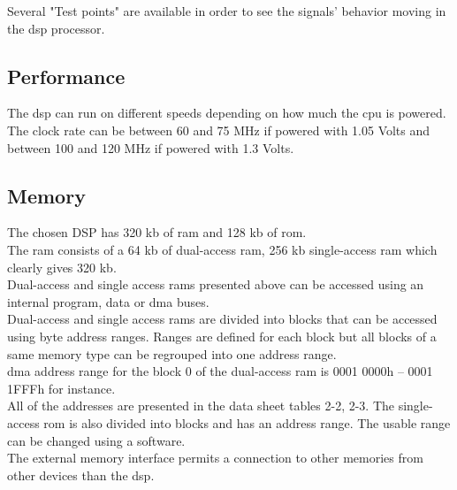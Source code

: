 Several "Test points" are available in order to see the signals' behavior moving in the \gls{dsp} processor.

\subsection{Performance}

The \gls{dsp} can run on different speeds depending on how much the \gls{cpu} is powered. The clock rate can be between 60 and 75 MHz if powered with 1.05 Volts and between 100 and 120 MHz if powered with 1.3 Volts. \\

\subsection{Memory}

The chosen DSP has 320 \gls{kb} of \gls{ram} and 128 \gls{kb} of \gls{rom}. \\
The \gls{ram} consists of a 64 \gls{kb} of dual-access \gls{ram}, 256 \gls{kb} single-access \gls{ram} which clearly gives 320 \gls{kb}. \\
Dual-access and single access \gls{ram}s presented above can be accessed using an internal program, data or \gls{dma} buses. \\
Dual-access and single access \gls{ram}s are divided into blocks that can be accessed using byte address ranges. Ranges are defined for each block but all blocks of a same memory type can be regrouped into one address range. \\
\gls{dma} address range for the block 0 of the dual-access \gls{ram} is 0001 0000h – 0001 1FFFh for instance. \\
All of the addresses are presented in the data sheet tables 2-2, 2-3.
The single-access \gls{rom} is also divided into blocks and has an address range. The usable range can be changed using a software. \\

The external memory interface permits a connection to other memories from other devices than the \gls{dsp}. 